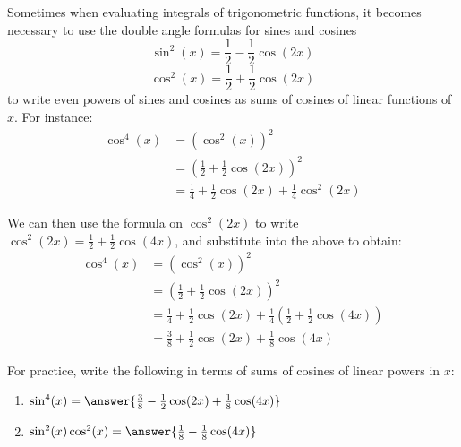 \documentclass{ximera}
\begin{document}
\begin{problem}
  Sometimes when evaluating integrals of trigonometric functions, it becomes necessary to use the double angle formulas for sines and cosines
  \[
    \sin^2(x) = \frac{1}{2} - \frac{1}{2}\cos(2x)
  \]
  \[
    \cos^2(x) = \frac{1}{2} + \frac{1}{2}\cos(2x)
  \]
  to write even powers of sines and cosines as sums of cosines of linear functions of $x$.
  For instance:
  \begin{align*}
    \cos^4(x) &= (\cos^2(x))^2 \\
    &= \left(\frac{1}{2} + \frac{1}{2}\cos(2x)\right)^2 \\
    &= \frac{1}{4} + \frac{1}{2}\cos(2x) + \frac{1}{4}\cos^2(2x)
  \end{align*}
  
  We can then use the formula on $\cos^2(2x)$ to write $\cos^2(2x) = \frac{1}{2} + \frac{1}{2}\cos(4x)$, and substitute into the above to obtain:
  \begin{align*}
    \cos^4(x) &= (\cos^2(x))^2\\
    &= \left(\frac{1}{2} + \frac{1}{2}\cos(2x)\right)^2 \\
    &= \frac{1}{4} + \frac{1}{2}\cos(2x) + \frac{1}{4}\left( \frac{1}{2} + \frac{1}{2}\cos(4x)\right) \\
    &= \frac{3}{8} + \frac{1}{2}\cos(2x) + \frac{1}{8}\cos(4x)
  \end{align*}
  
  For practice, write the following in terms of sums of cosines of
  linear powers in $x$:
  
  \begin{enumerate}
    \item $\sin^4(x) = \answer{\frac{3}{8} - \frac{1}{2}\cos(2x) + \frac{1}{8}\cos(4x)}$

    \item $\sin^2(x)\cos^2(x) = \answer{\frac{1}{8} - \frac{1}{8}\cos(4x)}$
  \end{enumerate}
\end{problem}
\end{document}
